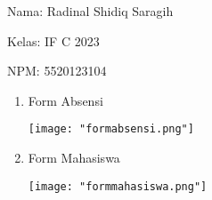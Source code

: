 \documentclass[12pt,a4paper]{article}
\date{}
\begin{document}
Nama: Radinal Shidiq Saragih

Kelas: IF C 2023

NPM: 5520123104

\begin{enumerate}

  \item Form Absensi

  \texttt{[image: "formabsensi.png"]}


  \item Form Mahasiswa 

  \texttt{[image: "formmahasiswa.png"]}


\end{enumerate}
\end{document}
